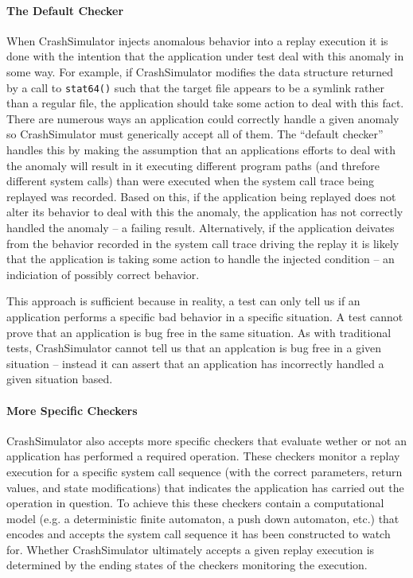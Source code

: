     
    \paragraph{The Default Checker}

    When CrashSimulator injects anomalous behavior into a replay execution it is
    done with the intention that the application under test deal with this
    anomaly in some way. For example, if CrashSimulator modifies the data
    structure returned by a call to {\tt stat64()} such that the target file
    appears to be a symlink rather than a regular file, the application should
    take some action to deal with this fact.  There are numerous ways an
    application could correctly handle a given anomaly so CrashSimulator must
    generically accept all of them.  The ``default checker'' handles this by
    making the assumption that an applications efforts to deal with the anomaly
    will result in it executing different program paths (and threfore different
    system calls) than were executed when the system call trace being replayed
    was recorded.  Based on this, if the application being replayed does not
    alter its behavior to deal with this the anomaly, the application has not
    correctly handled the anomaly -- a failing result.  Alternatively, if the
    application deivates from the behavior recorded in the system call trace
    driving the replay it is likely that the application is taking some action
    to handle the injected condition -- an indiciation of possibly correct
    behavior.

    This approach is sufficient because in reality, a test can only tell us if
    an application performs a specific bad behavior in a specific situation.  A
    test cannot prove that an application is bug free in the same situation.  As
    with traditional tests, CrashSimulator cannot tell us that an applcation is
    bug free in a given situation -- instead it can assert that an application
    has incorrectly handled a given situation based.
    

    \paragraph{More Specific Checkers}

    CrashSimulator also accepts more specific checkers that evaluate wether or
    not an application has performed a required operation.  These checkers
    monitor a replay execution for a specific system call sequence (with the
    correct parameters, return values, and state modifications) that indicates
    the application has carried out the operation in question.  To achieve this
    these checkers contain a computational model (e.g. a deterministic finite
    automaton, a push down automaton, etc.) that encodes and accepts the
    system call sequence it has been constructed to watch for.  Whether
    CrashSimulator ultimately accepts a given replay execution is determined by
    the ending states of the checkers monitoring the execution.


